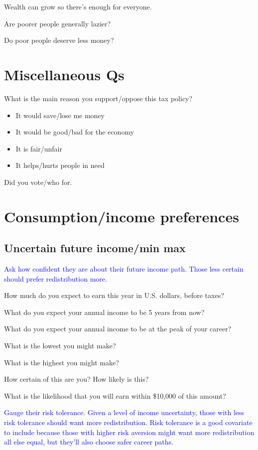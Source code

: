 \documentclass[12pt]{article}
\newcommand{\blue}[1]{\textcolor{blue}{#1}}
\begin{document}
    Wealth can grow so there’s enough for everyone.

    Are poorer people generally lazier?

    Do poor people deserve less money?

\section{Miscellaneous Qs}

    What is the main reason you support/oppose this tax policy?
    \begin{itemize}
        \item It would save/lose me money
        \item It would be good/bad for the economy
        \item It is fair/unfair
        \item It helps/hurts people in need
    \end{itemize}

    Did you vote/who for.

\section{Consumption/income preferences}

    \subsection{Uncertain future income/min max}

        \blue{Ask how confident they are about their future income path. Those less certain should prefer redistribution more.}

        How much do you expect to earn this year in U.S. dollars, before taxes?

        What do you expect your annual income to be 5 years from now?

        What do you expect your annual income to be at the peak of your career?

        What is the lowest you might make?

        What is the highest you might make?

        How certain of this are you? How likely is this?

        What is the likelihood that you will earn within \$10,000 of this amount?

        \blue{Gauge their risk tolerance. Given a level of income uncertainty, those with less risk tolerance should want more redistribution. Risk tolerance is a good covariate to include because those with higher risk aversion might want more redistribution all else equal, but they'll also choose safer career paths.}
    
\end{document}

